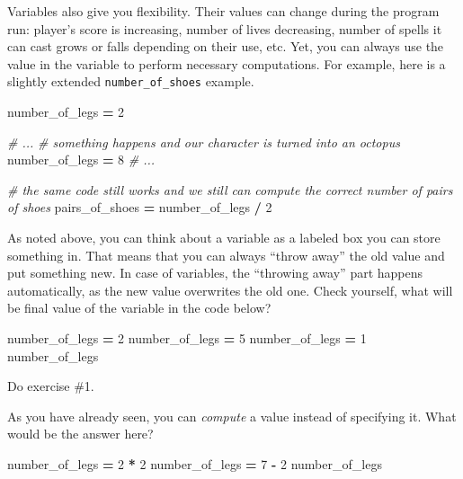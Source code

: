 \documentclass[
]{book}
\newenvironment{Shaded}{\begin{snugshade}}{\end{snugshade}}
\newcommand{\CommentTok}[1]{\textcolor[rgb]{0.56,0.35,0.01}{\textit{#1}}}
\newcommand{\DecValTok}[1]{\textcolor[rgb]{0.00,0.00,0.81}{#1}}
\newcommand{\NormalTok}[1]{#1}
\newcommand{\OperatorTok}[1]{\textcolor[rgb]{0.81,0.36,0.00}{\textbf{#1}}}
\begin{document}
Variables also give you flexibility. Their values can change during the program run: player's score is increasing, number of lives decreasing, number of spells it can cast grows or falls depending on their use, etc. Yet, you can always use the value in the variable to perform necessary computations. For example, here is a slightly extended \texttt{number\_of\_shoes} example.

\begin{Shaded}
\begin{Highlighting}[]
\NormalTok{number\_of\_legs }\OperatorTok{=} \DecValTok{2}

\CommentTok{\# ...}
\CommentTok{\# something happens and our character is turned into an octopus}
\NormalTok{number\_of\_legs }\OperatorTok{=} \DecValTok{8}
\CommentTok{\# ...}

\CommentTok{\# the same code still works and we still can compute the correct number of pairs of shoes}
\NormalTok{pairs\_of\_shoes }\OperatorTok{=}\NormalTok{ number\_of\_legs }\OperatorTok{/} \DecValTok{2}
\end{Highlighting}
\end{Shaded}

As noted above, you can think about a variable as a labeled box you can store something in. That means that you can always ``throw away'' the old value and put something new. In case of variables, the ``throwing away'' part happens automatically, as the new value overwrites the old one. Check yourself, what will be final value of the variable in the code below?

\begin{Shaded}
\begin{Highlighting}[]
\NormalTok{number\_of\_legs }\OperatorTok{=} \DecValTok{2}
\NormalTok{number\_of\_legs }\OperatorTok{=} \DecValTok{5}
\NormalTok{number\_of\_legs }\OperatorTok{=} \DecValTok{1}
\NormalTok{number\_of\_legs}
\end{Highlighting}
\end{Shaded}

Do exercise \#1.

As you have already seen, you can \emph{compute} a value instead of specifying it. What would be the answer here?

\begin{Shaded}
\begin{Highlighting}[]
\NormalTok{number\_of\_legs }\OperatorTok{=} \DecValTok{2} \OperatorTok{*} \DecValTok{2}
\NormalTok{number\_of\_legs }\OperatorTok{=} \DecValTok{7} \OperatorTok{{-}} \DecValTok{2}
\NormalTok{number\_of\_legs}
\end{Highlighting}
\end{Shaded}
\end{document}

